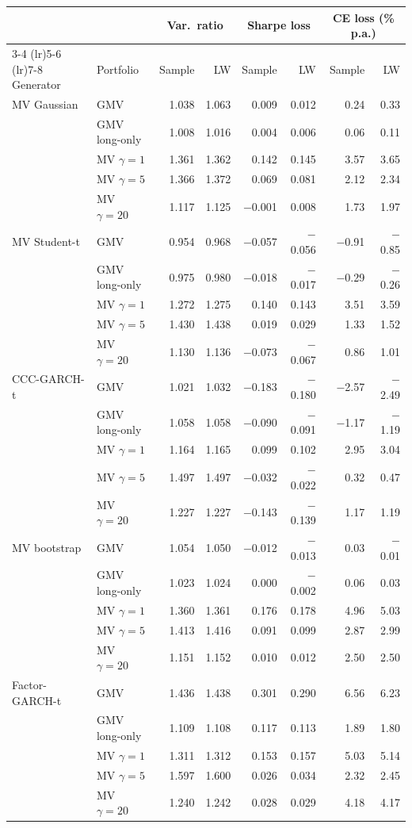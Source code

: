 \begin{tabular}{llrrrrrr}
\toprule
 &  & \multicolumn{2}{c}{Var.\ ratio} & \multicolumn{2}{c}{Sharpe loss} & \multicolumn{2}{c}{CE loss (\% p.a.)} \\
\cmidrule(lr){3-4} \cmidrule(lr){5-6} \cmidrule(lr){7-8}
Generator & Portfolio & Sample & LW & Sample & LW & Sample & LW \\
\midrule
MV Gaussian & GMV & 1.038 & 1.063 & 0.009 & 0.012 & 0.24 & 0.33 \\
 & GMV long-only & 1.008 & 1.016 & 0.004 & 0.006 & 0.06 & 0.11 \\
 & MV $\gamma=1$ & 1.361 & 1.362 & 0.142 & 0.145 & 3.57 & 3.65 \\
 & MV $\gamma=5$ & 1.366 & 1.372 & 0.069 & 0.081 & 2.12 & 2.34 \\
 & MV $\gamma=20$ & 1.117 & 1.125 & $-$0.001 & 0.008 & 1.73 & 1.97 \\
MV Student-t & GMV & 0.954 & 0.968 & $-$0.057 & $-$0.056 & $-$0.91 & $-$0.85 \\
 & GMV long-only & 0.975 & 0.980 & $-$0.018 & $-$0.017 & $-$0.29 & $-$0.26 \\
 & MV $\gamma=1$ & 1.272 & 1.275 & 0.140 & 0.143 & 3.51 & 3.59 \\
 & MV $\gamma=5$ & 1.430 & 1.438 & 0.019 & 0.029 & 1.33 & 1.52 \\
 & MV $\gamma=20$ & 1.130 & 1.136 & $-$0.073 & $-$0.067 & 0.86 & 1.01 \\
CCC-GARCH-t & GMV & 1.021 & 1.032 & $-$0.183 & $-$0.180 & $-$2.57 & $-$2.49 \\
 & GMV long-only & 1.058 & 1.058 & $-$0.090 & $-$0.091 & $-$1.17 & $-$1.19 \\
 & MV $\gamma=1$ & 1.164 & 1.165 & 0.099 & 0.102 & 2.95 & 3.04 \\
 & MV $\gamma=5$ & 1.497 & 1.497 & $-$0.032 & $-$0.022 & 0.32 & 0.47 \\
 & MV $\gamma=20$ & 1.227 & 1.227 & $-$0.143 & $-$0.139 & 1.17 & 1.19 \\
MV bootstrap & GMV & 1.054 & 1.050 & $-$0.012 & $-$0.013 & 0.03 & $-$0.01 \\
 & GMV long-only & 1.023 & 1.024 & 0.000 & $-$0.002 & 0.06 & 0.03 \\
 & MV $\gamma=1$ & 1.360 & 1.361 & 0.176 & 0.178 & 4.96 & 5.03 \\
 & MV $\gamma=5$ & 1.413 & 1.416 & 0.091 & 0.099 & 2.87 & 2.99 \\
 & MV $\gamma=20$ & 1.151 & 1.152 & 0.010 & 0.012 & 2.50 & 2.50 \\
Factor-GARCH-t & GMV & 1.436 & 1.438 & 0.301 & 0.290 & 6.56 & 6.23 \\
 & GMV long-only & 1.109 & 1.108 & 0.117 & 0.113 & 1.89 & 1.80 \\
 & MV $\gamma=1$ & 1.311 & 1.312 & 0.153 & 0.157 & 5.03 & 5.14 \\
 & MV $\gamma=5$ & 1.597 & 1.600 & 0.026 & 0.034 & 2.32 & 2.45 \\
 & MV $\gamma=20$ & 1.240 & 1.242 & 0.028 & 0.029 & 4.18 & 4.17 \\
\bottomrule
\end{tabular}
